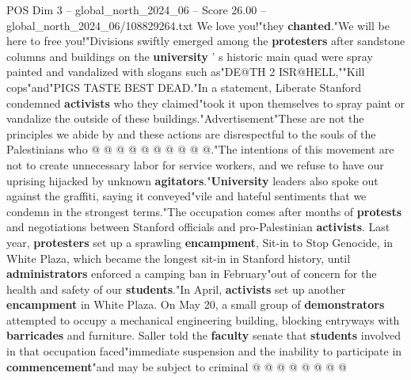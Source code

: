 \begin{textsample}{POS Dim 3 – global\_north\_2024\_06 – Score 26.00 – global\_north\_2024\_06/108829264.txt}
We love you!"they \textbf{chanted}."We will be here to free you!"Divisions swiftly emerged among the \textbf{protesters} after sandstone columns and buildings on the \textbf{university} ' s historic main quad were spray painted and vandalized with slogans such as"DE@TH 2 ISR@HELL,""Kill cops"and"PIGS TASTE BEST DEAD."In a statement, Liberate Stanford condemned \textbf{activists} who they claimed"took it upon themselves to spray paint or vandalize the outside of these buildings."Advertisement"These are not the principles we abide by and these actions are disrespectful to the souls of the Palestinians who @ @ @ @ @ @ @ @ @ @."The intentions of this movement are not to create unnecessary labor for service workers, and we refuse to have our uprising hijacked by unknown \textbf{agitators}."\textbf{University} leaders also spoke out against the graffiti, saying it conveyed"vile and hateful sentiments that we condemn in the strongest terms."The occupation comes after months of \textbf{protests} and negotiations between Stanford officials and pro-Palestinian \textbf{activists}.
Last year, \textbf{protesters} set up a sprawling \textbf{encampment}, Sit-in to Stop Genocide, in White Plaza, which became the longest sit-in in Stanford history, until \textbf{administrators} enforced a camping ban in February"out of concern for the health and safety of our \textbf{students}."In April, \textbf{activists} set up another \textbf{encampment} in White Plaza.
On May 20, a small group of \textbf{demonstrators} attempted to occupy a mechanical engineering building, blocking entryways with \textbf{barricades} and furniture.
Saller told the \textbf{faculty} senate that \textbf{students} involved in that occupation faced"immediate suspension and the inability to participate in \textbf{commencement}"and may be subject to criminal @ @ @ @ @ @ @ @

\end{textsample}
